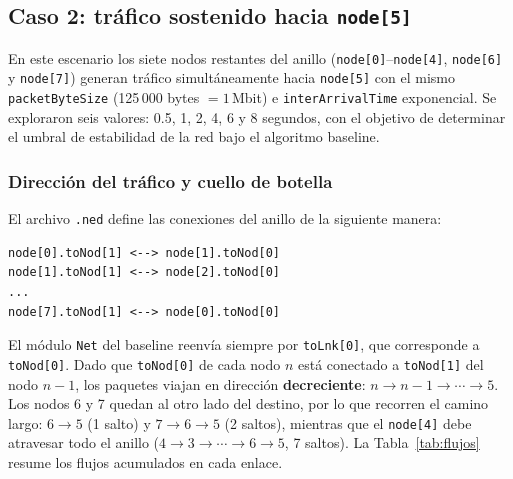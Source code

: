 \documentclass[10pt,letterpaper,twocolumn]{article}
\begin{document}
\subsection{Caso 2: tráfico sostenido hacia \texttt{node[5]}}
\label{sec:caso2}

En este escenario los siete nodos restantes del anillo
(\texttt{node[0]}--\texttt{node[4]}, \texttt{node[6]} y \texttt{node[7]})
generan tráfico simultáneamente hacia \texttt{node[5]} con el mismo
\texttt{packetByteSize} (125\,000 bytes $=1$\,Mbit) e
\texttt{interArrivalTime} exponencial. Se exploraron seis valores: 0.5, 1,
2, 4, 6 y 8 segundos, con el objetivo de determinar el umbral de
estabilidad de la red bajo el algoritmo baseline.

\subsubsection*{Dirección del tráfico y cuello de botella}

El archivo \texttt{.ned} define las conexiones del anillo de la siguiente
manera:

\begin{small}
\begin{verbatim}
node[0].toNod[1] <--> node[1].toNod[0]
node[1].toNod[1] <--> node[2].toNod[0]
...
node[7].toNod[1] <--> node[0].toNod[0]
\end{verbatim}
\end{small}

\noindent El módulo \texttt{Net} del baseline reenvía siempre por
\texttt{toLnk[0]}, que corresponde a \texttt{toNod[0]}. Dado que
\texttt{toNod[0]} de cada nodo $n$ está conectado a \texttt{toNod[1]} del
nodo $n-1$, los paquetes viajan en dirección \textbf{decreciente}:
$n \to n{-}1 \to \cdots \to 5$. Los nodos 6 y 7 quedan al otro lado del
destino, por lo que recorren el camino largo:
$6\to5$ (1 salto) y $7\to6\to5$ (2 saltos), mientras que el
\texttt{node[4]} debe atravesar todo el anillo ($4\to3\to\cdots\to6\to5$,
7 saltos). La Tabla~\ref{tab:flujos} resume los flujos acumulados
en cada enlace.
\end{document}
